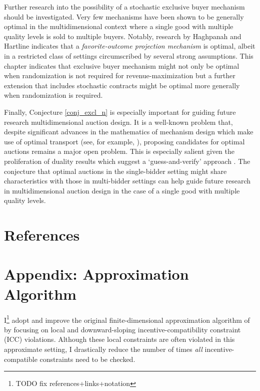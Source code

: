 \documentclass{article}
\begin{document}
Further research into the possibility of a stochastic exclusive buyer mechanism should be investigated. Very few mechanisms have been shown to be generally optimal in the multidimensional context where a single good with multiple quality levels is sold to multiple buyers. Notably, research by Haghpanah and Hartline \autocite*[Theorem 9]{haghpanah2014} indicates that a \textit{favorite-outcome projection mechanism} is optimal, albeit in a restricted class of settings circumscribed by several strong assumptions. This chapter indicates that exclusive buyer mechanism might not only be optimal when randomization is not required for revenue-maximization but a further extension that includes stochastic contracts might be optimal more generally when randomization is required.

Finally, Conjecture \ref{conj_excl_n} is especially important for guiding future research multidimensional auction design. It is a well-known problem that, despite significant advances in the mathematics of mechanism design which make use of optimal transport (see, for example, \cite{ekeland2010}), proposing candidates for optimal auctions remains a major open problem. This is especially salient given the proliferation of duality results which suggest a `guess-and-verify' approach \autocite{daskalakis2017strong,kolesnikov2022}. The conjecture that optimal auctions in the single-bidder setting might share characteristics with those in multi-bidder settings can help guide future research in multidimensional auction design in the case of a single good with multiple quality levels.




\newpage


\section{References}
\printbibliography[heading=none]




\section{Appendix: Approximation Algorithm}\label{appendix:algo}

I\footnote{\color{red}TODO fix references+links+notation} adopt and improve the original finite-dimensional approximation algorithm of \autocite{belloni2010multidimensional} by focusing on local and downward-sloping incentive-compatibility constraint (ICC) violations. Although these local constraints are often violated in this approximate setting, I drastically reduce the number of times \textit{all} incentive-compatible constraints need to be checked.
\end{document}

